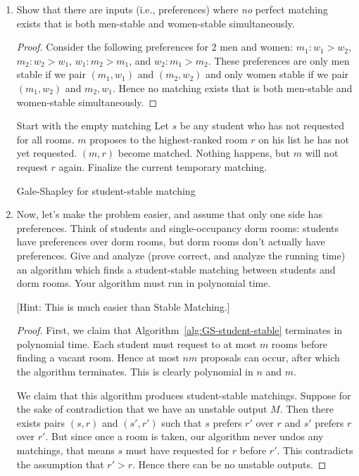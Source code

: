 \documentclass[10pt]{article}
\begin{document}
\begin{enumerate}
\item Show that there are inputs (i.e., preferences) where \emph{no} perfect matching exists that is both men-stable and women-stable simultaneously.

\begin{proof}
  Consider the following preferences for 2 men and women: \(m_1: w_1 > w_2\), \(m_2: w_2 > w_1\), \(w_1: m_2 > m_1\), and \(w_2: m_1 > m_2\). These preferences are only men stable if we pair \((m_1, w_1)\) and \((m_2, w_2)\) and only women stable if we pair \((m_1, w_2)\) and \(m_2, w_1\). Hence no matching exists that is both men-stable and women-stable simultaneously.
\end{proof}

\begin{algorithm}[htb]
  \begin{algorithmic}
    \STATE Start with the empty matching
      \STATE Let $s$ be any student who has not requested for all rooms.
      \STATE $m$ proposes to the highest-ranked room \(r\) on his list he has not yet requested.
        \STATE $(m,r)$ become matched.
      \ELSE
        \STATE Nothing happens, but $m$ will not request $r$ again.  
      \ENDIF
     \ENDWHILE
     \STATE Finalize the current temporary matching.
  \end{algorithmic}
\caption{Gale-Shapley for student-stable matching \label{alg:GS-student-stable}}
\end{algorithm}

\item Now, let's make the problem easier, and assume that only one side has preferences. Think of students and single-occupancy dorm rooms: students have preferences over dorm rooms, but dorm rooms don't actually have preferences.
  Give and analyze (prove correct, and analyze the running time) an algorithm which finds a student-stable matching between students and dorm rooms.
  Your algorithm must run in polynomial time.

  [Hint: This is much easier than Stable Matching.]

\begin{proof}
   First, we claim that Algorithm~\ref{alg:GS-student-stable} terminates in polynomial time. Each student must request to at most \(m\) rooms before finding a vacant room. Hence at most \(nm\) proposals can occur, after which the algorithm terminates. This is clearly polynomial in \(n\) and \(m\).

   We claim that this algorithm produces student-stable matchings. Suppose for the sake of contradiction that we have an unstable output \(M\). Then there exists pairs \((s, r)\) and \((s', r')\) such that \(s\) prefers \(r'\) over \(r\) and \(s'\) prefers \(r\) over \(r'\). But since once a room is taken, our algorithm never undos any matchings, that means \(s\) must have requested for \(r\) before \(r'\). This contradicts the assumption that \(r' > r\). Hence there can be no unstable outputs.
\end{proof}

\end{enumerate}
\end{document}
